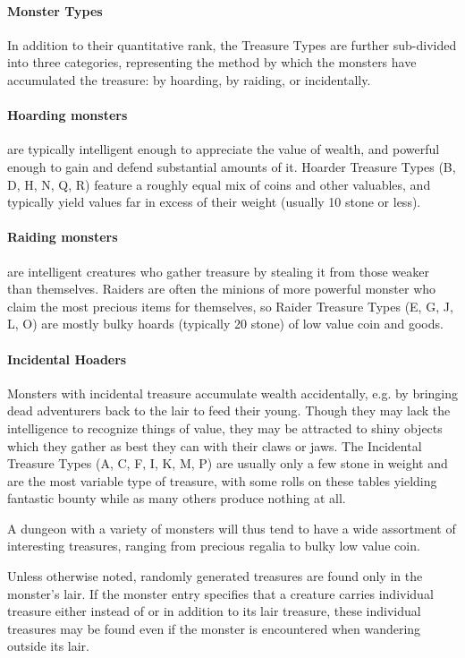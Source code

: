 \begin{multicols}{2}
\paragraph{Monster Types} In addition to their quantitative rank, the Treasure Types are further sub-divided into three categories, representing the method by which the monsters have accumulated the treasure: by hoarding, by raiding, or incidentally. 

\paragraph{Hoarding monsters} are typically intelligent enough to appreciate the value of wealth, and powerful enough to gain and defend substantial amounts of it. Hoarder Treasure Types (B, D, H, N, Q, R) feature a roughly equal mix of coins and other valuables, and typically yield values far in excess of their weight (usually 10 stone or less).

\paragraph{Raiding monsters} are intelligent creatures who gather treasure by stealing it from those weaker than themselves. Raiders are often the minions of more powerful monster who claim the most precious items for themselves, so Raider Treasure Types (E, G, J, L, O) are mostly bulky hoards (typically 20 stone) of low value coin and goods.

\paragraph{Incidental Hoaders} Monsters with incidental treasure accumulate wealth accidentally, e.g. by bringing dead adventurers back to the lair to feed their young. Though they may lack the intelligence to recognize things of value, they may be attracted to shiny objects which they gather as best they can with their claws or jaws. The Incidental Treasure Types (A, C, F, I, K, M, P) are usually only a few stone in weight and are the most variable type of treasure, with some rolls on these tables yielding fantastic bounty while as many others produce nothing at all.

A dungeon with a variety of monsters will thus tend to have a wide assortment of interesting treasures, ranging from precious regalia to bulky low value coin.

Unless otherwise noted, randomly generated treasures are found only in the monster’s lair. If the monster entry specifies that a creature carries individual treasure either instead of or in addition to its lair treasure, these individual treasures may be found even if the monster is encountered when wandering outside its lair.
\end{multicols}
